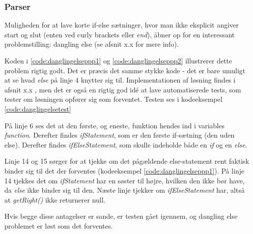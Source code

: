 \subsubsection{Parser}

Muligheden for at lave korte if-else sætninger, hvor man ikke eksplicit angiver start og slut (enten ved curly brackets  eller \textit{end}), åbner op for en interessant problemstilling: dangling else (se afsnit x.x for mere info). 



\noindent Koden i \ref{code:danglingelseppp1} og \ref{code:danglingelseppp2} illustrerer dette problem rigtig godt. Det er præcis det samme stykke kode - det er bare umuligt at se hvad \textit{else} på linje 4 knytter sig til. Implementationen af løsning findes i afsnit x.x , men det er også en rigtig god idé at lave automatiserede tests, som tester om løsningen opfører sig som forventet. Testen ses i kodeeksempel \ref{code:danglingelsetest}


\noindent På linje 6 ses det at den første, og eneste, funktion hendes ind i variables \textit{function}. Derefter findes \textit{ifStatement}, som er den første if-sætning (den uden else). Derefter findes \textit{ifElseStatement}, som skulle indeholde både en \textit{if} og en \textit{else}.

Linje 14 og 15 sørger for at tjekke om det pågældende else-statement rent faktisk binder sig til det der forventes (kodeeksempel \ref{code:danglingelseppp1}). På linje 14 tjekkes det om \textit{ifStatement} har en søster  til højre, hvilken den ikke bør have, da \textit{else} ikke binder sig til den. Næste linje tjekker om \textit{ifElseStatement} har, altså at \textit{getRight()} ikke returnerer null. 

Hvis begge disse antagelser er sande, er testen gået igennem, og dangling else problemet er løst som det forventes.